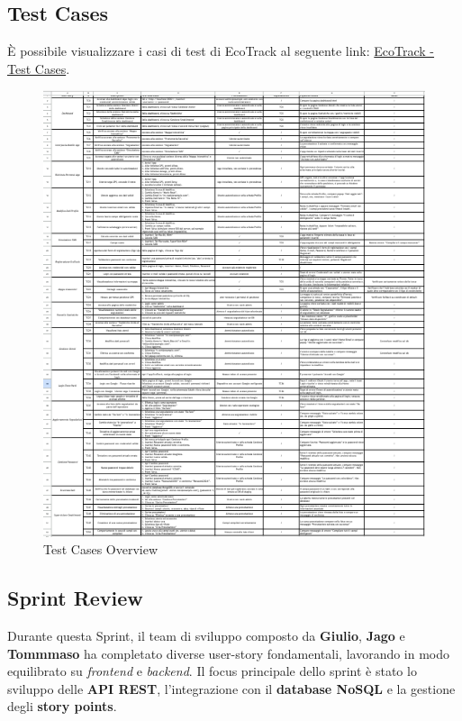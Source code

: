 \vspace{12 cm}

\subsection{Test Cases}
È possibile visualizzare i casi di test di EcoTrack al seguente link: \href{https://docs.google.com/spreadsheets/d/19TjIHKf8wvDxEds9eg8yDFcew4lJyGeI82jz5czIyQI/edit?usp=sharing}{EcoTrack - Test Cases}.
\begin{figure}[H]
    \centering
    \includegraphics[width=1\linewidth]{D3-G1//Img/Screenshot Test Cases.png}
    \caption{Test Cases Overview}
    \label{fig:enter-label}
\end{figure}

\subsection{Sprint Review}

Durante questa Sprint, il team di sviluppo composto da \textbf{Giulio}, \textbf{Jago} e \textbf{Tommmaso} ha completato diverse user-story fondamentali, lavorando in modo equilibrato su \textit{frontend} e \textit{backend}. Il focus principale dello sprint è stato lo sviluppo delle \textbf{API REST}, l’integrazione con il \textbf{database NoSQL} e la gestione degli \textbf{story points}.

